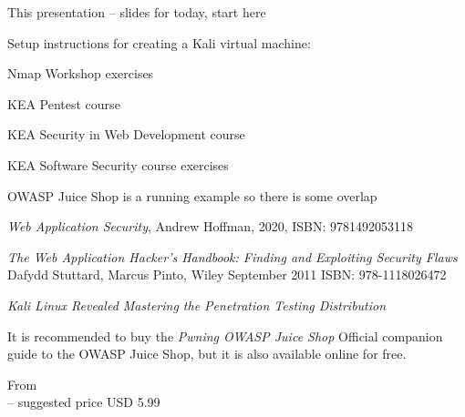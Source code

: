 \documentclass[Screen16to9,17pt]{foils}
\begin{document}
\begin{list2}
\item This presentation -- slides for today, start here
\item Setup instructions for creating a Kali virtual machine:\\
\item Nmap Workshop exercises\\{\footnotesize
{}}
\item KEA Pentest course\\{\footnotesize
{}}
\item KEA Security in Web Development course\\{\footnotesize
{}}
\item KEA Software Security course exercises\\{\footnotesize
{}}
\end{list2}

OWASP Juice Shop is a running example so there is some overlap


\begin{list2}
\item \emph{Web Application Security}, Andrew Hoffman, 2020, ISBN: 9781492053118
\item \emph{The Web Application Hacker's Handbook: Finding and Exploiting Security Flaws}
Dafydd Stuttard, Marcus Pinto, Wiley September 2011 ISBN: 978-1118026472
\item \emph{Kali Linux Revealed Mastering the Penetration Testing Distribution}\\
\end{list2}

It is recommended to buy the \emph{Pwning OWASP Juice Shop} Official companion guide to the OWASP Juice Shop, but it is also available online for free.

From \link{https://leanpub.com/juice-shop](https://leanpub.com/juice-shop}\\
-- suggested price USD 5.99
\end{document}
